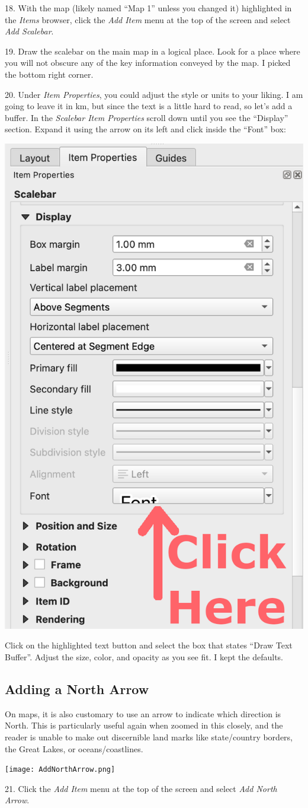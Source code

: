 \documentclass[oneside,a4paper,11pt,explicit]{book}
\begin{document}
18. With the map (likely named ``Map 1'' unless you changed it) highlighted in the \textit{Items} browser, click the \textit{Add Item} menu at the top of the screen and select \textit{Add Scalebar}.

19. Draw the scalebar on the main map in a logical place. Look for a place where you will not obscure any of the key information conveyed by the map. I picked the bottom right corner.

20. Under \textit{Item Properties}, you could adjust the style or units to your liking. I am going to leave it in km, but since the text is a little hard to read, so let's add a buffer. In the \textit{Scalebar Item Properties} scroll down until you see the ``Display'' section. Expand it using the arrow on its left and click inside the ``Font'' box:

\vspace{.25em}

\centerline{\includegraphics[width=.24\textwidth]{AdjustScalebar.png}}

Click on the highlighted text button and select the box that states ``Draw Text Buffer''. Adjust the size, color, and opacity as you see fit. I kept the defaults. 

\subsection{Adding a North Arrow}

On maps, it is also customary to use an arrow to indicate which direction is North. This is particularly useful again when zoomed in this closely, and the reader is unable to make out discernible land marks like state/country borders, the Great Lakes, or oceans/coastlines. 

\vspace{.25em}

\centerline{\texttt{[image: AddNorthArrow.png]}}

21. Click the \textit{Add Item} menu at the top of the screen and select \textit{Add North Arrow}.
\end{document}
